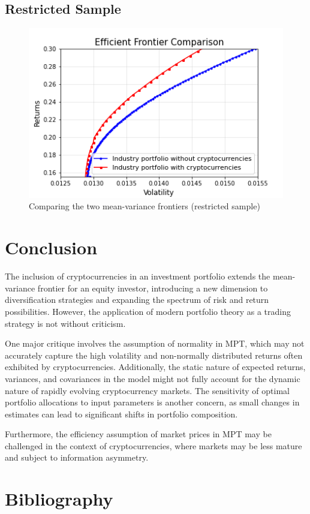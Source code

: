 \documentclass[12pt,a4paper]{article}
\begin{document}
\subsection{Restricted Sample}\label{sec:restricted sample}
\begin{figure}[H]
    \centering
    \includegraphics[width=1\linewidth]{Figures/Efficient_Frontier_Comparison_Bull_Market.png}
    \caption{Comparing the two mean-variance frontiers (restricted sample)}
    \label{fig:restricted}
\end{figure}

\section{Conclusion}\label{sec:discussion}
The inclusion of cryptocurrencies in an investment portfolio extends the mean-variance frontier for an equity investor, 
introducing a new dimension to diversification strategies and expanding the spectrum of risk and return possibilities.
 However, the application of modern portfolio theory as a trading strategy is not without criticism. 

\noindent One major critique involves the assumption of normality in MPT, which may not accurately capture the high volatility
 and non-normally distributed returns often exhibited by cryptocurrencies. Additionally, the static nature of expected returns,
  variances, and covariances in the model might not fully account for the dynamic nature of rapidly evolving cryptocurrency 
  markets. The sensitivity of optimal portfolio allocations to input parameters is another concern, as small changes in 
  estimates can lead to significant shifts in portfolio composition.

\noindent Furthermore, the efficiency assumption of market prices in MPT may be challenged in the context of cryptocurrencies, 
where markets may be less mature and subject to information asymmetry.

\section{Bibliography}\label{sec:bibliography}



\end{document}
